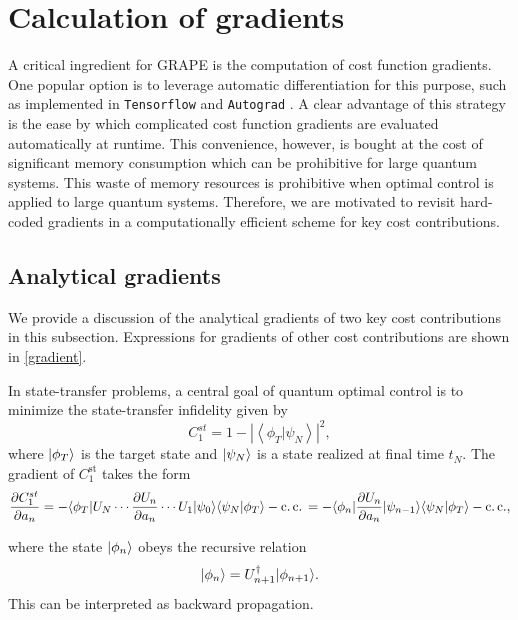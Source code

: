 \section{Calculation of gradients}
\label{gradients main text}
A critical ingredient for GRAPE is the computation of cost function gradients. One popular option is to leverage automatic differentiation for this purpose, such as implemented in \texttt{Tensorflow} \cite{tensorflow2015-whitepaper} and \texttt{Autograd} \cite{maclaurin2015autograd}. A clear advantage of this strategy is the ease by which complicated cost function gradients are evaluated automatically at runtime. This convenience, however, is bought at the cost of significant memory consumption which can be prohibitive for large quantum systems. This waste of memory resources is prohibitive when optimal control is applied to large quantum systems.
Therefore, we are motivated to revisit hard-coded gradients in a computationally efficient scheme for key cost contributions.

\subsection{Analytical gradients \label{c1c2}}
We provide a discussion of the analytical gradients of two key cost contributions in this subsection. Expressions for gradients of other cost contributions are shown in \ref{gradient}.

In state-transfer problems, a central goal of quantum optimal control is to minimize the state-transfer infidelity given by 
\begin{equation}
\label{C1st}
    C_1^
{st}=1-\left|\left\langle\phi_T | \psi_{N}\right\rangle\right|^{2},
\end{equation} 
where $|\phi_T\rangle$ is the target state and $|\psi_N\rangle$ is a state realized at final time $t_N$. The gradient of $C_1^{\text{st}}$ takes the form
\begin{equation}
\label{stgradient}
    \frac{\partial C_1^{st} }{\partial a_{ n}}
  =- \langle\phi_T|U_N\cdots \frac {\partial U_{n}}{\partial a_{n}}\cdots U_1|\psi_0\rangle\langle\psi_N|\phi_T\rangle -\operatorname{c.c.}\\
=-\langle\phi_{n}|\frac {\partial U_n }{\partial a_{n}}|\psi_{n-1}\rangle\langle\psi_N|\phi_T\rangle - \operatorname{c.c.} ,
\end{equation}
 
where the state $|\phi_{n}\rangle$ obeys the recursive relation
\begin{equation}
    |\phi_{n}\rangle=U_{n+1}^\dagger|\phi_{n+1}\rangle.
\end{equation}
This can be interpreted as backward propagation.

